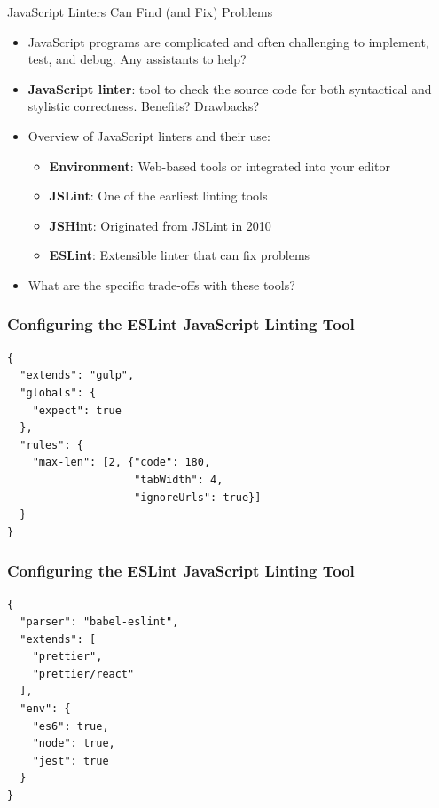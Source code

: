 \documentclass[14pt,aspectratio=169]{beamer}
\begin{document}
%
\begin{frame}{JavaScript Linters Can Find (and Fix) Problems}
  \begin{itemize}
    \item JavaScript programs are complicated and often challenging to
      implement, test, and debug. Any assistants to help?
      \vspace*{-.15in}
    \item {\bf JavaScript linter}: tool to check the source code for both
      syntactical and stylistic correctness. Benefits? Drawbacks?
      \vspace*{-.35in}
    \item Overview of JavaScript linters and their use:
      \begin{itemize}
        \item {\bf Environment}: Web-based tools or integrated into your editor
        \item {\bf JSLint}: One of the earliest linting tools
        \item {\bf JSHint}: Originated from JSLint in 2010
        \item {\bf ESLint}: Extensible linter that can fix problems
      \end{itemize}
      \vspace*{-.25in}
    \item What are the specific trade-offs with these tools?
  \end{itemize}
\end{frame}

%
\begin{frame}[fragile]
  \frametitle{Configuring the ESLint JavaScript Linting Tool}
  \normalsize
  \begin{minipage}{6in}
    \vspace*{.2in}
    \begin{verbatim}
{
  "extends": "gulp",
  "globals": {
    "expect": true
  },
  "rules": {
    "max-len": [2, {"code": 180,
                    "tabWidth": 4,
                    "ignoreUrls": true}]
  }
}
    \end{verbatim}
  \end{minipage}
\end{frame}

%
\begin{frame}[fragile]
  \frametitle{Configuring the ESLint JavaScript Linting Tool}
  \normalsize
  \begin{minipage}{6in}
    \vspace*{.1in}
    \begin{verbatim}
{
  "parser": "babel-eslint",
  "extends": [
    "prettier",
    "prettier/react"
  ],
  "env": {
    "es6": true,
    "node": true,
    "jest": true
  }
}
    \end{verbatim}
  \end{minipage}
\end{frame}
\end{document}

